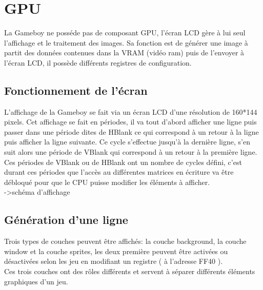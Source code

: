 \documentclass{report}
\begin{document}
\section{GPU}

La Gameboy ne posséde pas de composant GPU, l'écran LCD gère à lui seul l'affichage et le traitement des images. Sa fonction est de générer une image à partit des données contenues dans la VRAM (vidéo ram) puis de l'envoyer à l'écran LCD, il possède différents registres de configuration.

\subsection{Fonctionnement de l'écran}

L'affichage de la Gameboy se fait via un écran LCD d'une résolution de 160*144 pixels. Cet affichage se fait en périodes, il va tout d'abord afficher une ligne puis passer dans une période dites de HBlank ce qui correspond à un retour à la ligne puis afficher la ligne suivante. Ce cycle s'effectue jusqu'à la dernière ligne, s'en suit alors une période de VBlank qui correspond à un retour à la première ligne.\\
Ces périodes de VBlank ou de HBlank ont un nombre de cycles défini, c'est
durant ces périodes que l'accès au différentes matrices en écriture va être
débloqué pour que le CPU puisse modifier les éléments à afficher.\\

->schéma d'affichage

\subsection{Génération d'une ligne}

Trois types de couches peuvent être affichés: la couche background, la couche
window et la couche sprites, les deux première peuvent être activées ou
désactivées selon les jeu en modifiant un registre ( à l'adresse FF40 ).\\

Ces trois couches ont des rôles différents et servent à séparer différents
éléments graphiques d'un jeu.\\
\end{document}
